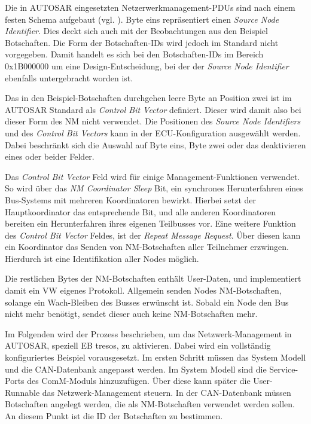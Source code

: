 \documentclass[
  a4paper,					    %
  twoside,
  DIV=calc,     				%
  bibliography=totoc,
  cleardoublepage=empty,
  ngerman,     					%
  final       					%
]{scrbook}
\begin{document}
Die in AUTOSAR eingesetzten Netzerwerkmanagement-PDUs sind nach einem festen Schema aufgebaut (vgl. \cite[Seite 51]{autosar_cannm}). Byte eins repräsentiert einen \emph{Source Node Identifier}. Dies deckt sich auch mit der Beobachtungen aus den Beispiel Botschaften. Die Form der Botschaften-IDs wird jedoch im Standard nicht vorgegeben. Damit handelt es sich bei den Botschaften-IDs im Bereich 0x1B000000 um eine Design-Entscheidung, bei der der \emph{Source Node Identifier} ebenfalls untergebracht worden ist.

Das in den Beispiel-Botschaften durchgehen leere Byte an Position zwei ist im AUTOSAR Standard als \emph{Control Bit Vector} definiert. Dieser wird damit also bei dieser Form des NM nicht verwendet. Die Positionen des \emph{Source Node Identifiers} und des \emph{Control Bit Vectors} kann in der ECU-Konfiguration ausgewählt werden. Dabei beschränkt sich die Auswahl auf Byte eins, Byte zwei oder das deaktivieren eines oder beider Felder.

Das \emph{Control Bit Vector} Feld wird für einige Management-Funktionen verwendet. So wird über das \emph{NM Coordinator Sleep} Bit, ein synchrones Herunterfahren eines Bus-Systems mit mehreren Koordinatoren bewirkt. Hierbei setzt der Hauptkoordinator das entsprechende Bit, und alle anderen Koordinatoren bereiten ein Herunterfahren ihres eigenen Teilbusses vor. Eine weitere Funktion des \emph{Control Bit Vector} Feldes, ist der \emph{Repeat Message Request}. Über diesen kann ein Koordinator das Senden von NM-Botschaften aller Teilnehmer erzwingen. Hierdurch ist eine Identifikation aller Nodes möglich.

Die restlichen Bytes der NM-Botschaften enthält User-Daten, und implementiert damit ein VW eigenes Protokoll. Allgemein senden Nodes NM-Botschaften, solange ein Wach-Bleiben des Busses erwünscht ist. Sobald ein Node den Bus nicht mehr benötigt, sendet dieser auch keine NM-Botschaften mehr.

Im Folgenden wird der Prozess beschrieben, um das Netzwerk-Management in AUTOSAR, speziell EB tresos, zu aktivieren. Dabei wird ein vollständig konfiguriertes Beispiel vorausgesetzt. Im ersten Schritt müssen das System Modell und die CAN-Datenbank angepasst werden. Im System Modell sind die Service-Ports des ComM-Moduls hinzuzufügen. Über diese kann später die User-Runnable das Netzwerk-Management steuern. In der CAN-Datenbank müssen Botschaften angelegt werden, die als NM-Botschaften verwendet werden sollen. An diesem Punkt ist die ID der Botschaften zu bestimmen.
\end{document}
